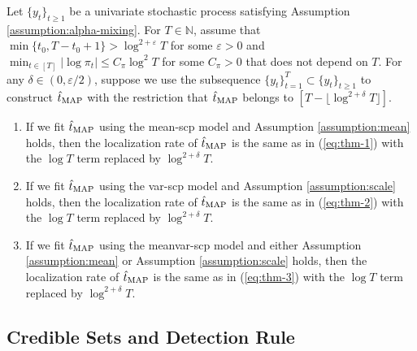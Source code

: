 \begin{theorem}\label{theorem:alpha-mixing}
    Let $\{y_t\}_{t \geq 1}$ be a univariate stochastic process satisfying Assumption \ref{assumption:alpha-mixing}. For $T \in \mathbb{N}$, assume that $\min\{t_0, T-t_0+1\} > \log^{2+\varepsilon} T$ for some $\varepsilon > 0$ and $\min_{t\in[T]} |\log \pi_{t}| \leq C_\pi \log^2 T$ for some $C_\pi > 0$ that does not depend on $T$.  For any $\delta \in (0,\varepsilon/2)$, suppose we use the subsequence $\{y_t\}_{t = 1}^T \subset \{y_t\}_{t \geq 1}$ to construct $\hat{t}_{\normalfont \text{MAP}}$ with the restriction that $\hat{t}_{\normalfont \text{MAP}}$ belongs to $[T - \lfloor \log^{2+\delta} T\rfloor]$.
    \vspace{-10pt}
    \begin{enumerate}[label=\normalfont(\roman*)]
        \item If we fit $\hat{t}_{\normalfont \text{MAP}}$ using the mean-scp model and Assumption \ref{assumption:mean} holds, then the localization rate of $\hat{t}_{\normalfont \text{MAP}}$ is the same as in (\ref{eq:thm-1}) with the $\log T$ term replaced by $\log^{2+\delta} T$. \vspace{-5pt}
        \item If we fit $\hat{t}_{\normalfont \text{MAP}}$ using  the var-scp model and Assumption \ref{assumption:scale} holds, then the localization rate of $\hat{t}_{\normalfont \text{MAP}}$ is the same as in (\ref{eq:thm-2}) with the $\log T$ term replaced by $\log^{2+\delta} T$. \vspace{-5pt}
        \item If we fit $\hat{t}_{\normalfont \text{MAP}}$ using the meanvar-scp model and either Assumption \ref{assumption:mean} or Assumption \ref{assumption:scale} holds, then the localization rate of $\hat{t}_{\normalfont \text{MAP}}$ is the same as in (\ref{eq:thm-3}) with the $\log T$ term replaced by $\log^{2+\delta} T$.
    \end{enumerate}
\end{theorem}

\subsection{Credible Sets and Detection Rule}
\label{sec:cred-sets}

